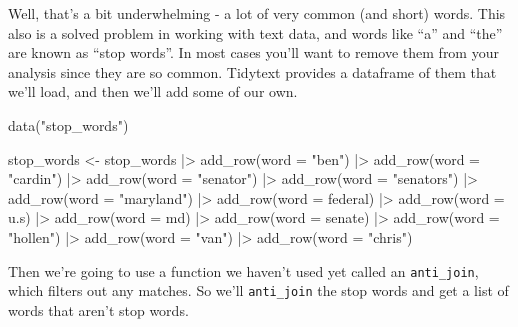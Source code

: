 \documentclass[
  letterpaper,
  DIV=11,
  numbers=noendperiod]{scrreprt}
\newenvironment{Shaded}{\begin{snugshade}}{\end{snugshade}}
\newcommand{\AttributeTok}[1]{\textcolor[rgb]{0.40,0.45,0.13}{#1}}
\newcommand{\FunctionTok}[1]{\textcolor[rgb]{0.28,0.35,0.67}{#1}}
\newcommand{\NormalTok}[1]{\textcolor[rgb]{0.00,0.23,0.31}{#1}}
\newcommand{\OtherTok}[1]{\textcolor[rgb]{0.00,0.23,0.31}{#1}}
\newcommand{\SpecialCharTok}[1]{\textcolor[rgb]{0.37,0.37,0.37}{#1}}
\newcommand{\StringTok}[1]{\textcolor[rgb]{0.13,0.47,0.30}{#1}}
\begin{document}
Well, that's a bit underwhelming - a lot of very common (and short)
words. This also is a solved problem in working with text data, and
words like ``a'' and ``the'' are known as ``stop words''. In most cases
you'll want to remove them from your analysis since they are so common.
Tidytext provides a dataframe of them that we'll load, and then we'll
add some of our own.

\begin{Shaded}
\begin{Highlighting}[]
\FunctionTok{data}\NormalTok{(}\StringTok{"stop\_words"}\NormalTok{)}

\NormalTok{stop\_words }\OtherTok{\textless{}{-}}\NormalTok{ stop\_words }\SpecialCharTok{|\textgreater{}} 
  \FunctionTok{add\_row}\NormalTok{(}\AttributeTok{word =} \StringTok{"ben"}\NormalTok{) }\SpecialCharTok{|\textgreater{}} 
  \FunctionTok{add\_row}\NormalTok{(}\AttributeTok{word =} \StringTok{"cardin"}\NormalTok{) }\SpecialCharTok{|\textgreater{}} 
  \FunctionTok{add\_row}\NormalTok{(}\AttributeTok{word =} \StringTok{"senator"}\NormalTok{) }\SpecialCharTok{|\textgreater{}}
  \FunctionTok{add\_row}\NormalTok{(}\AttributeTok{word =} \StringTok{"senators"}\NormalTok{) }\SpecialCharTok{|\textgreater{}}
  \FunctionTok{add\_row}\NormalTok{(}\AttributeTok{word =} \StringTok{"maryland"}\NormalTok{) }\SpecialCharTok{|\textgreater{}}
  \FunctionTok{add\_row}\NormalTok{(}\AttributeTok{word =} \StringTok{\textquotesingle{}federal\textquotesingle{}}\NormalTok{) }\SpecialCharTok{|\textgreater{}} 
  \FunctionTok{add\_row}\NormalTok{(}\AttributeTok{word =} \StringTok{\textquotesingle{}u.s\textquotesingle{}}\NormalTok{) }\SpecialCharTok{|\textgreater{}} 
  \FunctionTok{add\_row}\NormalTok{(}\AttributeTok{word =} \StringTok{\textquotesingle{}md\textquotesingle{}}\NormalTok{) }\SpecialCharTok{|\textgreater{}} 
  \FunctionTok{add\_row}\NormalTok{(}\AttributeTok{word =} \StringTok{\textquotesingle{}senate\textquotesingle{}}\NormalTok{) }\SpecialCharTok{|\textgreater{}} 
  \FunctionTok{add\_row}\NormalTok{(}\AttributeTok{word =} \StringTok{"hollen"}\NormalTok{) }\SpecialCharTok{|\textgreater{}} 
  \FunctionTok{add\_row}\NormalTok{(}\AttributeTok{word =} \StringTok{"van"}\NormalTok{) }\SpecialCharTok{|\textgreater{}} 
  \FunctionTok{add\_row}\NormalTok{(}\AttributeTok{word =} \StringTok{"chris"}\NormalTok{)}
\end{Highlighting}
\end{Shaded}

Then we're going to use a function we haven't used yet called an
\texttt{anti\_join}, which filters out any matches. So we'll
\texttt{anti\_join} the stop words and get a list of words that aren't
stop words.
\end{document}
